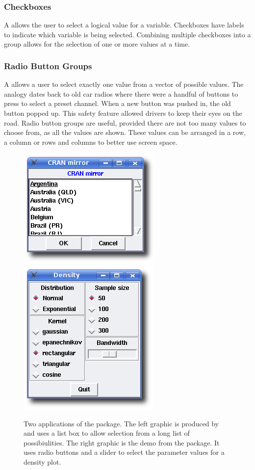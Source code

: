 \subsubsection{Checkboxes}
\label{sec:GUI:checkboxes}

A  allows the user to select a logical value for a
variable. Checkboxes have labels to indicate which variable is being
selected. Combining multiple checkboxes into a group
allows for the selection of one or more values at a time.  


\subsubsection{Radio Button Groups}
\label{sec:GUI:radio=button-groups}

A  allows a user to select exactly one value from a
vector of possible values. The analogy dates back to old car radios
where there were a handful of buttons to press to select a preset channel. When a new
button was pushed in, the old button popped up. This safety feature
allowed drivers to keep their eyes on the road.
Radio button groups are useful, provided there are not too many values to choose from, as
all the values are shown. These values can be arranged in a row, a
column or rows and columns to better use screen space.

\begin{figure}
  \centering
  \includegraphics[width=.35\textwidth]{ex-listbox}
  \includegraphics[width=.35\textwidth]{tcltk-tkdensity}
  \caption{
    Two applications of the  package. 
    The left graphic is
    produced by  and uses a list box to
    allow selection from a long list of possibiulities.
    The right graphic is the  demo from the
    package. It uses radio buttons and a slider to select the
    parameter values for a density plot.
  }
  \label{fig:GUI:ex-tcltk}
\end{figure}

